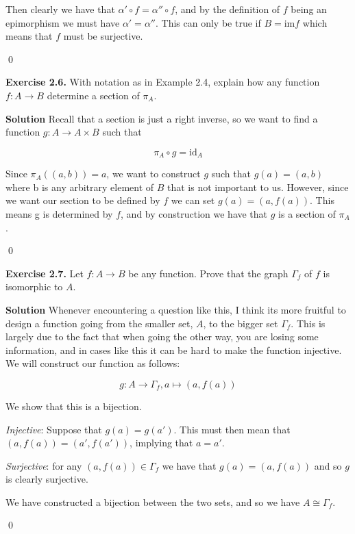 \documentclass[titlepage]{article}
\begin{document}
Then clearly we have that $\alpha ' \circ f = \alpha '' \circ f$, and by the definition of $f$ being an epimorphism we must have $\alpha ' = \alpha ''$. This can only be true if $B = \text{im} f$ which means that $f$ must be surjective.

\qed

\bigskip

\textbf{Exercise 2.6.} With notation as in Example 2.4, explain how any function $f:A \to B$ determine a section of $\pi_A$.

\medskip

\textbf{Solution} Recall that a section is just a right inverse, so we want to find a function $g:A \to A \times B$ such that

\[ \pi_A \circ g = \text{id}_{A} \]

Since $\pi_A((a,b)) = a$, we want to construct $g$ such that $g(a) = (a,b)$ where b is any arbitrary element of $B$ that is not important to us. However, since we want our section to be defined by $f$ we can set $g(a)=(a,f(a))$. This means g is determined by $f$, and by construction we have that $g$ is a section of $\pi_A$.

\qed

\bigskip

\textbf{Exercise 2.7.} Let $f:A \to B$ be any function. Prove that the graph $\Gamma_f$ of $f$ is isomorphic to $A$.

\medskip

\textbf{Solution} Whenever encountering a question like this, I think its more fruitful to design a function going from the smaller set, $A$, to the bigger set $\Gamma_f$. This is largely due to the fact that when going the other way, you are losing some information, and in cases like this it can be hard to make the function injective. We will construct our function as follows:

\[ g:A \to \Gamma_f, a \mapsto (a,f(a)) \]

We show that this is a bijection.

\textit{Injective}: Suppose that $g(a)=g(a')$. This must then mean that $(a,f(a))=(a',f(a'))$, implying that $a = a'$.

\textit{Surjective}: for any $(a,f(a)) \in \Gamma_f$ we have that $g(a) = (a,f(a))$ and so $g$ is clearly surjective.

We have constructed a bijection between the two sets, and so we have $A \cong \Gamma_f$.

\qed

\bigskip
\end{document}

